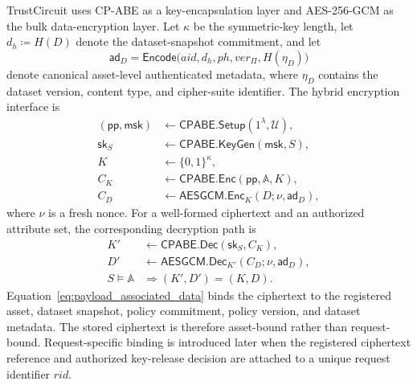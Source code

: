 \documentclass[10pt,journal,compsoc]{IEEEtran}
\begin{document}
TrustCircuit uses CP-ABE as a key-encapsulation layer and AES-256-GCM as the bulk data-encryption layer. Let $\kappa$ be the symmetric-key length, let $d_h\coloneqq H(D)$ denote the dataset-snapshot commitment, and let
\begin{equation}
\mathsf{ad}_{D}
=
\mathsf{Encode}
\bigl(aid,d_h,ph,ver_{\Pi},H(\eta_D)\bigr)
\label{eq:payload_associated_data}
\end{equation}
denote canonical asset-level authenticated metadata, where $\eta_D$ contains the dataset version, content type, and cipher-suite identifier. The hybrid encryption interface is
\begin{equation}
\begin{aligned}
(\mathsf{pp},\mathsf{msk}) &\leftarrow
\mathsf{CPABE.Setup}(1^\lambda,\mathcal{U}),\\
\mathsf{sk}_{S} &\leftarrow \mathsf{CPABE.KeyGen}(\mathsf{msk},S),\\
K &\leftarrow \{0,1\}^{\kappa},\\
C_{K} &\leftarrow \mathsf{CPABE.Enc}(\mathsf{pp},\mathbb{A},K),\\
C_{D} &\leftarrow \mathsf{AESGCM.Enc}_{K} (D;\nu,\mathsf{ad}_{D}),
\end{aligned}
\label{eq:cpabe_hybrid_encryption}
\end{equation}
where $\nu$ is a fresh nonce. For a well-formed ciphertext and an authorized attribute set, the corresponding decryption path is
\begin{equation}
\begin{aligned}
K' &\leftarrow \mathsf{CPABE.Dec} (\mathsf{sk}_{S},C_K),\\
D' &\leftarrow \mathsf{AESGCM.Dec}_{K'} (C_D;\nu,\mathsf{ad}_{D}),\\
S\models\mathbb{A} &\Longrightarrow (K',D')=(K,D).
\end{aligned}
\label{eq:cpabe_hybrid_decryption}
\end{equation}
Equation~\eqref{eq:payload_associated_data} binds the ciphertext to the registered asset, dataset snapshot, policy commitment, policy version, and dataset metadata. The stored ciphertext is therefore asset-bound rather than request-bound. Request-specific binding is introduced later when the registered ciphertext reference and authorized key-release decision are attached to a unique request identifier $rid$.
\end{document}
